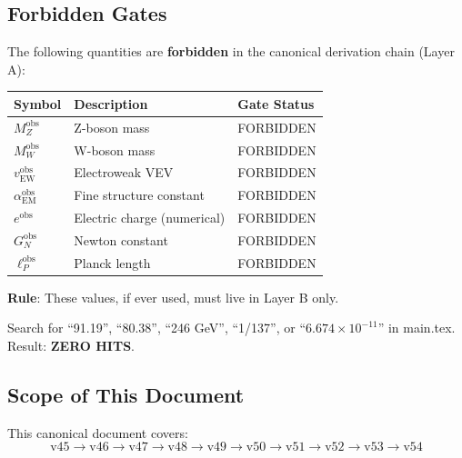 \documentclass[11pt,a4paper]{article}
\begin{document}
\subsection{Forbidden Gates}
\label{subsec:forbidden-gates}

The following quantities are \textbf{forbidden} in the canonical derivation chain (Layer A):

\begin{forbiddenbox}
\label{box:forbidden-anchors}
\begin{center}
\begin{tabular}{lll}
\toprule
\textbf{Symbol} & \textbf{Description} & \textbf{Gate Status} \\
\midrule
$M_Z^{\text{obs}}$ & Z-boson mass & FORBIDDEN \\
$M_W^{\text{obs}}$ & W-boson mass & FORBIDDEN \\
$v_{\text{EW}}^{\text{obs}}$ & Electroweak VEV & FORBIDDEN \\
$\alpha_{\text{EM}}^{\text{obs}}$ & Fine structure constant & FORBIDDEN \\
$e^{\text{obs}}$ & Electric charge (numerical) & FORBIDDEN \\
$G_N^{\text{obs}}$ & Newton constant & FORBIDDEN \\
$\ell_P^{\text{obs}}$ & Planck length & FORBIDDEN \\
\bottomrule
\end{tabular}
\end{center}
\textbf{Rule}: These values, if ever used, must live in Layer B only.
\end{forbiddenbox}

\begin{trapbox}
\label{trap:rt01}
Search for ``91.19'', ``80.38'', ``246 GeV'', ``1/137'', or ``$6.674\times 10^{-11}$'' in main.tex. Result: \textbf{ZERO HITS}.
\end{trapbox}

\subsection{Scope of This Document}
\label{subsec:scope}

This canonical document covers:
\begin{equation}
\label{eq:scope-chain}
\text{v45} \to \text{v46} \to \text{v47} \to \text{v48} \to \text{v49} \to \text{v50} \to \text{v51} \to \text{v52} \to \text{v53} \to \text{v54}
\end{equation}
\end{document}
